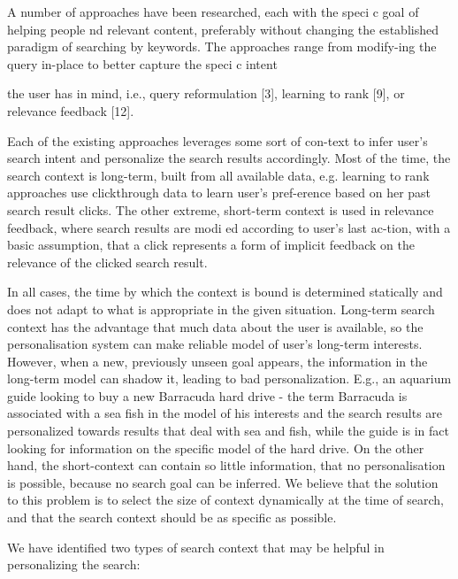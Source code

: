 \documentclass{sig-alternate} %
\begin{document}
A number of approaches have been researched, each with the speci c goal of helping people nd relevant content, preferably without changing the established paradigm of searching by keywords. The approaches range from modify-ing the query in-place to better capture the speci c intent

the user has in mind, i.e., query reformulation [3], learning to rank [9], or relevance feedback [12].

Each of the existing approaches leverages some sort of con-text to infer user's search intent and personalize the search results accordingly. Most of the time, the search context is long-term, built from all available data, e.g. learning to rank approaches use clickthrough data to learn user's pref-erence based on her past search result clicks. The other extreme, short-term context is used in relevance feedback, where search results are modi ed according to user's last ac-tion, with a basic assumption, that a click represents a form of implicit feedback on the relevance of the clicked search result.

In all cases, the time by which the context is bound is
determined statically and does not adapt to what is 
appropriate in the given situation. Long-term search context
has the advantage that much data about the user is available, 
so the personalisation system can make reliable model
of user's long-term interests. However, when a new, previously 
unseen goal appears, the information in the long-term
model can shadow it, leading to bad personalization. E.g.,
an aquarium guide looking to buy a new Barracuda hard
drive - the term Barracuda is associated with a sea fish in
the model of his interests and the search results are 
personalized towards results that deal with sea and fish, while the
guide is in fact looking for information on the specific model
of the hard drive. On the other hand, the short-context can
contain so little information, that no personalisation is possible, 
because no search goal can be inferred. We believe
that the solution to this problem is to select the size of context 
dynamically at the time of search, and that the search
context should be as specific as possible.

We have identified two types of search context that may
be helpful in personalizing the search:
\end{document}
